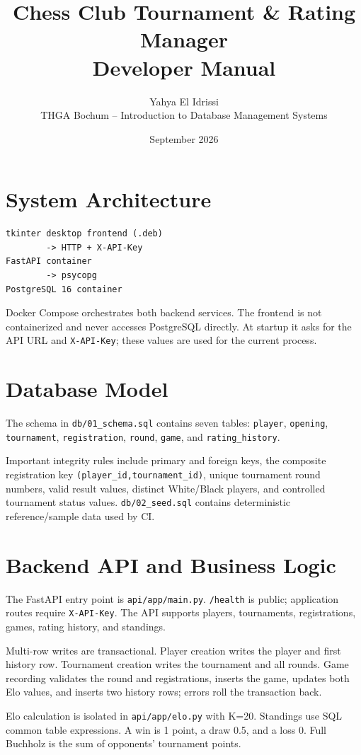 \documentclass[11pt,a4paper]{article}
\title{Chess Club Tournament \& Rating Manager\\Developer Manual}
\author{Yahya El Idrissi\\THGA Bochum -- Introduction to Database Management Systems}
\date{September 2026}
\begin{document}
\maketitle
\tableofcontents
\newpage

\section{System Architecture}
\begin{verbatim}
tkinter desktop frontend (.deb)
        -> HTTP + X-API-Key
FastAPI container
        -> psycopg
PostgreSQL 16 container
\end{verbatim}
Docker Compose orchestrates both backend services. The frontend is not containerized and never accesses PostgreSQL directly. At startup it asks for the API URL and \texttt{X-API-Key}; these values are used for the current process.

\section{Database Model}
The schema in \texttt{db/01\_schema.sql} contains seven tables: \texttt{player}, \texttt{opening}, \texttt{tournament}, \texttt{registration}, \texttt{round}, \texttt{game}, and \texttt{rating\_history}.

Important integrity rules include primary and foreign keys, the composite registration key \texttt{(player\_id,tournament\_id)}, unique tournament round numbers, valid result values, distinct White/Black players, and controlled tournament status values. \texttt{db/02\_seed.sql} contains deterministic reference/sample data used by CI.

\section{Backend API and Business Logic}
The FastAPI entry point is \texttt{api/app/main.py}. \texttt{/health} is public; application routes require \texttt{X-API-Key}. The API supports players, tournaments, registrations, games, rating history, and standings.

Multi-row writes are transactional. Player creation writes the player and first history row. Tournament creation writes the tournament and all rounds. Game recording validates the round and registrations, inserts the game, updates both Elo values, and inserts two history rows; errors roll the transaction back.

Elo calculation is isolated in \texttt{api/app/elo.py} with K=20. Standings use SQL common table expressions. A win is 1 point, a draw 0.5, and a loss 0. Full Buchholz is the sum of opponents' tournament points.
\end{document}

